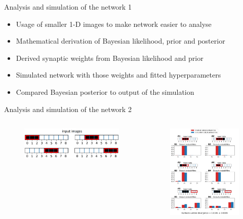 \documentclass[aspectratio=169]{beamer}
\begin{document}
\begin{frame}{Analysis and
 simulation of the network 1}
	\begin{itemize}
	  \item Usage of smaller 1-D images to make network easier to analyse 
	  \item Mathematical derivation of Bayesian likelihood, prior and posterior
	  \item Derived synaptic weights from Bayesian likelihood and prior
	  \item Simulated network with those weights and fitted hyperparameters
	  \item Compared Bayesian posterior to output of the simulation
	\end{itemize}
\end{frame}

\begin{frame}{Analysis and
 simulation of the network 2}
 \vspace{-1.0cm}
   \begin{columns}
     \begin{column}{0.3\textwidth}
     	\begin{figure}
        \includegraphics[width=1\linewidth]{../Latex/figures/1D/4_1DInputImages.png}
      \end{figure}
     \end{column}
     \begin{column}{0.4\textwidth}
		\begin{figure}
        \includegraphics[width=0.75\linewidth]{../Latex/figures/1D/1D_98_440_4.png}

\end{figure}
\end{column}
\end{columns}
\end{frame}
\end{document}
